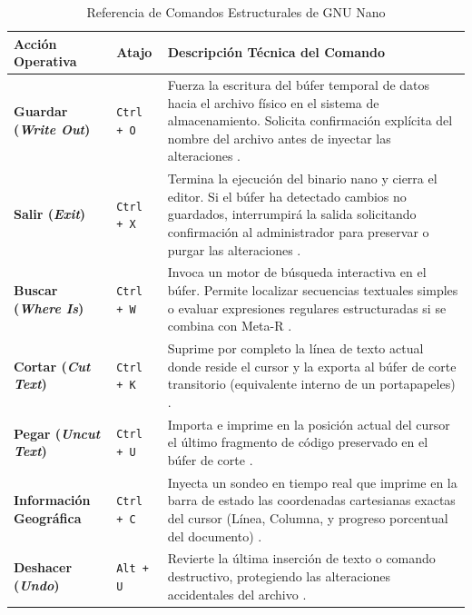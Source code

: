 \documentclass[a4paper,12pt]{article}
\begin{document}
\begin{table}[H]
    \centering
    \renewcommand{\arraystretch}{1.3}
    \caption{Referencia de Comandos Estructurales de GNU Nano}
    \vspace{0.2cm}
    \begin{tabular}{|p{3.5cm}|p{2cm}|p{9cm}|}
        \hline
        \textbf{Acción Operativa} & \textbf{Atajo} & \textbf{Descripción Técnica del Comando} \\
        \hline
        \textbf{Guardar (\textit{Write Out})} & \texttt{Ctrl + O} & Fuerza la escritura del búfer temporal de datos hacia el archivo físico en el sistema de almacenamiento. Solicita confirmación explícita del nombre del archivo antes de inyectar las alteraciones \cite{librebyte_nano, arsys_nano}. \\
        \hline
        \textbf{Salir (\textit{Exit})} & \texttt{Ctrl + X} & Termina la ejecución del binario nano y cierra el editor. Si el búfer ha detectado cambios no guardados, interrumpirá la salida solicitando confirmación al administrador para preservar o purgar las alteraciones \cite{nano_editor_official}. \\
        \hline
        \textbf{Buscar (\textit{Where Is})} & \texttt{Ctrl + W} & Invoca un motor de búsqueda interactiva en el búfer. Permite localizar secuencias textuales simples o evaluar expresiones regulares estructuradas si se combina con Meta-R \cite{librebyte_nano}. \\
        \hline
        \textbf{Cortar (\textit{Cut Text})} & \texttt{Ctrl + K} & Suprime por completo la línea de texto actual donde reside el cursor y la exporta al búfer de corte transitorio (equivalente interno de un portapapeles) \cite{librebyte_nano}. \\
        \hline
        \textbf{Pegar (\textit{Uncut Text})} & \texttt{Ctrl + U} & Importa e imprime en la posición actual del cursor el último fragmento de código preservado en el búfer de corte \cite{nano_editor_official}. \\
        \hline
        \textbf{Información Geográfica} & \texttt{Ctrl + C} & Inyecta un sondeo en tiempo real que imprime en la barra de estado las coordenadas cartesianas exactas del cursor (Línea, Columna, y progreso porcentual del documento) \cite{arsys_nano, nano_editor_official}. \\
        \hline
        \textbf{Deshacer (\textit{Undo})} & \texttt{Alt + U} & Revierte la última inserción de texto o comando destructivo, protegiendo las alteraciones accidentales del archivo \cite{nano_editor_official}. \\
        \hline
    \end{tabular}
\end{table}
\end{document}
